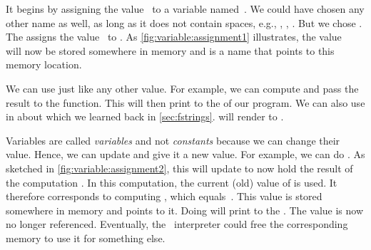 It begins by assigning the  value~ to a variable named~.
We could have chosen any other name as well, as long as it does not contain spaces, e.g., , , .
But we chose .
The \pythonilIdx{=} assigns the value~ to .
As \cref{fig:variable:assignment1} illustrates, the value~ will now be stored somewhere in memory and  is a name that points to this memory location.%
%
\begin{sloppypar}%
We can use  just like any other value.
For example, we can compute  and pass the result to the  function.
This will then print  to the  of our program.
We can also use  in  about which we learned back in \cref{sec:fstrings}.
 will render to .%
\end{sloppypar}%
%
Variables are called \emph{variables} and not \emph{constants} because we can change their value.
Hence, we can update  and give it a new value.
For example, we can do .
As sketched in \cref{fig:variable:assignment2}, this will update  to now hold the result of the computation .
In this computation, the current (old) value of  is used.
It therefore corresponds to computing , which equals~.
This value is stored somewhere in memory and  points to it.
Doing  will print  to the .
The value  is now no longer referenced.
Eventually, the \python\ interpreter could free the corresponding memory to use it for something else.

